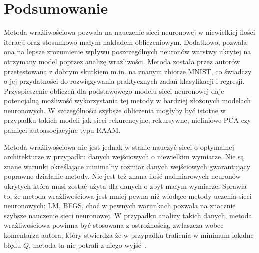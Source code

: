 \documentclass[11pt,a4paper]{article}
\begin{document}
\section{Podsumowanie}
Metoda wrażliwościowa pozwala na nauczenie sieci neuronowej w niewielkiej ilości iteracji oraz stosunkowo małym nakładem obliczeniowym. Dodatkowo, pozwala ona na lepsze zrozumienie wpływu poszczególnych neuronów warstwy ukrytej na otrzymany model poprzez analizę wrażliwości. Metoda została przez autorów przetestowana z dobrym skutkiem m.in. na znanym zbiorze MNIST, co świadczy o jej przydatności do rozwiązywania praktycznych zadań klasyfikacji i regresji. Przyspieszenie obliczeń dla podstawowego modelu sieci neuronowej daje potencjalną możliwość wykorzystania tej metody w bardziej złożonych modelach neuronowych. W szczególności szybsze obliczenia mogłyby być istotne w przypadku takich modeli jak sieci rekurencyjne, rekursywne, nieliniowe PCA czy pamięci autoasocjacyjne typu RAAM.

Metoda wrażliwościowa nie jest jednak w stanie nauczyć sieci o optymalnej architekturze w przypadku danych wejściowych o niewielkim wymiarze. Nie są znane warunki określające minimalny rozmiar danych wejściowych gwarantujący poprawne działanie metody. Nie jest też znana ilość nadmiarowych neuronów ukrytych która musi zostać użyta dla danych o zbyt małym wymiarze. Sprawia to, że metoda wrażliwościowa jest mniej pewna niż wiodące metody uczenia sieci neuronowych: LM, BFGS, choć w pewnych warunkach pozwala na znacznie szybsze nauczenie sieci neuronowej. W przypadku analizy takich danych, metoda wrażliwościowa powinna być stosowana z ostrożnością, zwłaszcza wobec komentarza autora, który stwierdza że w przypadku trafienia w minimum lokalne błędu $Q$, metoda ta nie potrafi z niego wyjść~\cite{castillo2006very}.



\end{document}
